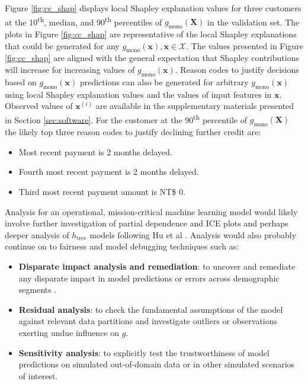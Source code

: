 \documentclass[sigconf]{acmart}
\begin{document}
Figure \ref{fig:cc_shap} displays local Shapley explanation values for three customers at the 10\textsuperscript{th}, median, and 90\textsuperscript{th} percentiles of $g_{\text{mono}}(\mathbf{X})$ in the validation set. The plots in Figure \ref{fig:cc_shap} are representative of the local Shapley explanations that could be generated for any $g_{\text{mono}}(\mathbf{x}), \mathbf{x} \in \mathcal{X}$. The values presented in Figure \ref{fig:cc_shap} are aligned with the general expectation that Shapley contributions will increase for increasing values of $g_{\text{mono}}(\mathbf{x})$. Reason codes to justify decisions based on $g_{\text{mono}}(\mathbf{x})$ predictions can also be generated for arbitrary $g_{\text{mono}}(\mathbf{x})$ using local Shapley explanation values and the values of input features in $\mathbf{x}$. 
Observed values of $\mathbf{x}^{(i)}$ are available in the supplementary materials presented in Section \ref{sec:software}. For the customer at the 90\textsuperscript{th} percentile of $g_{\text{mono}}(\mathbf{X})$ the likely top three reason codes to justify declining further credit are:

\begin{itemize}

\item Most recent payment is 2 months delayed.
\item Fourth most recent payment is 2 months delayed.
\item Third most recent payment amount is NT\$ 0.

\end{itemize} 

Analysis for an operational, mission-critical machine learning model would likely involve further investigation of partial dependence and ICE plots and perhaps deeper analysis of $h_{\text{tree}}$ models following Hu et al \cite{lime-sup}. Analysis would also probably continue on to fairness and model debugging techniques such as:

\begin{itemize}

\item \textbf{Disparate impact analysis and remediation}: to uncover and remediate any disparate impact in model predictions or errors across demographic segments \cite{feldman2015certifying}.
\item \textbf{Residual analysis}: to check the fundamental assumptions of the model against relevant data partitions and investigate outliers or observations exerting undue influence on $g$. 
\item \textbf{Sensitivity analysis}: to explicitly test the trustworthiness of model predictions on simulated out-of-domain data or in other simulated scenarios of interest.  

\end{itemize} 
\end{document}
